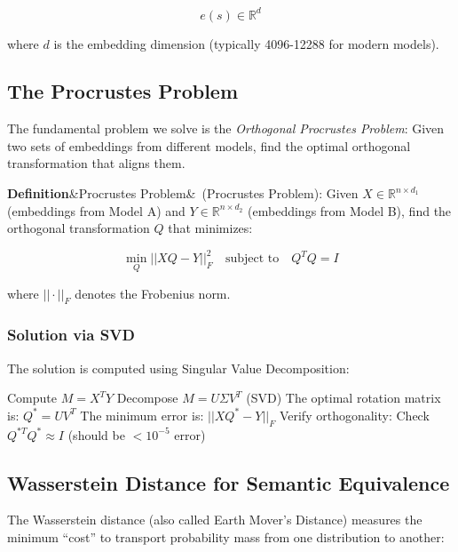\documentclass[12pt,a4paper,oneside]{report}
\newenvironment{definition}[1][]{\par\noindent\textbf{Definition}\ifx&#1&\else~(#1)\fi:\quad}{\par}
\begin{document}
\begin{equation}
e(s) \in \mathbb{R}^d
\end{equation}

where $d$ is the embedding dimension (typically 4096-12288 for modern models).

\subsection{The Procrustes Problem}

The fundamental problem we solve is the \textit{Orthogonal Procrustes Problem}: Given two sets of embeddings from different models, find the optimal orthogonal transformation that aligns them.

\begin{definition}[Procrustes Problem]
Given $X \in \mathbb{R}^{n \times d_1}$ (embeddings from Model A) and $Y \in \mathbb{R}^{n \times d_2}$ (embeddings from Model B), find the orthogonal transformation $Q$ that minimizes:

\begin{equation}
\min_Q ||XQ - Y||_F^2 \quad \text{subject to} \quad Q^T Q = I
\end{equation}

where $||\cdot||_F$ denotes the Frobenius norm.
\end{definition}

\subsubsection{Solution via SVD}

The solution is computed using Singular Value Decomposition:

\begin{algorithm}
\caption{SVD-Based Procrustes Solver}
\begin{algorithmic}
\State Compute $M = X^T Y$
\State Decompose $M = U \Sigma V^T$ (SVD)
\State The optimal rotation matrix is: $Q^* = U V^T$
\State The minimum error is: $||XQ^* - Y||_F$
\State Verify orthogonality: Check $Q^{*T} Q^* \approx I$ (should be $< 10^{-5}$ error)
\end{algorithmic}
\end{algorithm}

\subsection{Wasserstein Distance for Semantic Equivalence}

The Wasserstein distance (also called Earth Mover's Distance) measures the minimum ``cost'' to transport probability mass from one distribution to another:
\end{document}
